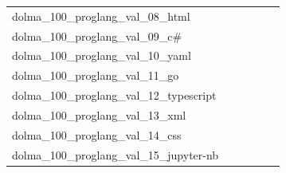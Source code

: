 \documentclass[dvipsnames]{article}
\begin{document}
\begin{appendix}
{\begin{longtable}{m{6cm}m{1.7cm}m{1.7cm}m{1.7cm}m{1.7cm}m{1.7cm}}
	dolma\_100\_proglang\_val\_08\_html  & \colorbox[HTML]{9dd687}{\makebox[\mywidth][c]{1.92}} & \colorbox[HTML]{d8efa2}{\makebox[\mywidth][c]{1.94}} & \colorbox[HTML]{ffffe5}{\makebox[\mywidth][c]{2.13}} & \colorbox[HTML]{8ccf81}{\makebox[\mywidth][c]{1.91}} & \colorbox[HTML]{77c578}{\makebox[\mywidth][c]{1.91}}\\
	dolma\_100\_proglang\_val\_09\_c\#  & \colorbox[HTML]{e7f5ad}{\makebox[\mywidth][c]{2.23}} & \colorbox[HTML]{fbfdd1}{\makebox[\mywidth][c]{2.28}} & \colorbox[HTML]{ffffe5}{\makebox[\mywidth][c]{2.45}} & \colorbox[HTML]{77c578}{\makebox[\mywidth][c]{2.19}} & \colorbox[HTML]{eff8b3}{\makebox[\mywidth][c]{2.24}}\\
	dolma\_100\_proglang\_val\_10\_yaml  & \colorbox[HTML]{86cc7e}{\makebox[\mywidth][c]{2.93}} & \colorbox[HTML]{d1ec9f}{\makebox[\mywidth][c]{3.01}} & \colorbox[HTML]{ffffe5}{\makebox[\mywidth][c]{3.71}} & \colorbox[HTML]{96d385}{\makebox[\mywidth][c]{2.94}} & \colorbox[HTML]{77c578}{\makebox[\mywidth][c]{2.92}}\\
	dolma\_100\_proglang\_val\_11\_go  & \colorbox[HTML]{77c578}{\makebox[\mywidth][c]{1.75}} & \colorbox[HTML]{e4f4ab}{\makebox[\mywidth][c]{1.78}} & \colorbox[HTML]{ffffe5}{\makebox[\mywidth][c]{1.97}} & \colorbox[HTML]{bee496}{\makebox[\mywidth][c]{1.77}} & \colorbox[HTML]{81c97c}{\makebox[\mywidth][c]{1.75}}\\
	dolma\_100\_proglang\_val\_12\_typescript  & \colorbox[HTML]{a5d98b}{\makebox[\mywidth][c]{2.17}} & \colorbox[HTML]{e3f4aa}{\makebox[\mywidth][c]{2.20}} & \colorbox[HTML]{ffffe5}{\makebox[\mywidth][c]{2.41}} & \colorbox[HTML]{b4e091}{\makebox[\mywidth][c]{2.18}} & \colorbox[HTML]{77c578}{\makebox[\mywidth][c]{2.16}}\\
	dolma\_100\_proglang\_val\_13\_xml  & \colorbox[HTML]{77c578}{\makebox[\mywidth][c]{2.44}} & \colorbox[HTML]{e7f5ad}{\makebox[\mywidth][c]{2.50}} & \colorbox[HTML]{ffffe5}{\makebox[\mywidth][c]{2.78}} & \colorbox[HTML]{98d485}{\makebox[\mywidth][c]{2.46}} & \colorbox[HTML]{c8e89a}{\makebox[\mywidth][c]{2.48}}\\
	dolma\_100\_proglang\_val\_14\_css  & \colorbox[HTML]{fafdce}{\makebox[\mywidth][c]{2.25}} & \colorbox[HTML]{fafdca}{\makebox[\mywidth][c]{2.25}} & \colorbox[HTML]{ffffe5}{\makebox[\mywidth][c]{2.34}} & \colorbox[HTML]{a5d98b}{\makebox[\mywidth][c]{2.21}} & \colorbox[HTML]{77c578}{\makebox[\mywidth][c]{2.20}}\\
	dolma\_100\_proglang\_val\_15\_jupyter-nb  & \colorbox[HTML]{77c578}{\makebox[\mywidth][c]{1.57}} & \colorbox[HTML]{e1f3a9}{\makebox[\mywidth][c]{1.60}} & \colorbox[HTML]{ffffe5}{\makebox[\mywidth][c]{1.75}} & \colorbox[HTML]{b7e193}{\makebox[\mywidth][c]{1.58}} & \colorbox[HTML]{aadc8d}{\makebox[\mywidth][c]{1.58}}\\

\end{longtable}}
\end{appendix}
\end{document}
